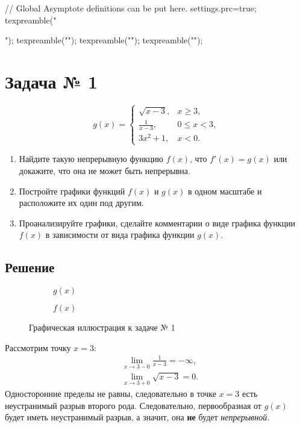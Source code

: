 \documentclass[a4paper,12pt]{article}
\begin{document}
\begin{asydef}
// Global Asymptote definitions can be put here.
settings.prc=true;
texpreamble("\usepackage{xltxtra,unicode-math}");
texpreamble("\setmainfont{Times New Roman}");
texpreamble("\setsansfont{Arial}\setmonofont{Courier New}");
texpreamble("");
\end{asydef}

\section{Задача № 1}

\[
  g(x) =
  \begin{cases}
    \sqrt{x - 3}, & x \ge 3, \\
    \frac{1}{x - 3}, & 0 \le x < 3, \\
    3 x^2 + 1, & x < 0.
  \end{cases}
\]

\begin{enumerate}
  \item
    Найдите такую непрерывную функцию \(f(x)\),
    что \(f'(x) = g(x)\) или докажите, что она не может быть непрерывна.
  \item
    Постройте графики функций \(f(x)\) и \(g(x)\) в одном масштабе
    и расположите их один под другим.
  \item
    Проанализируйте графики,
    сделайте комментарии о виде графика функции \(f(x)\)
    в зависимости от вида графика функции \(g(x)\).
\end{enumerate}

\subsection{Решение}

\begin{figure}[htbp]
  \centering
  \begin{subfigure}{\textwidth}
    \centering
    \caption{\(g(x)\)}\label{fig:1-g}
  \end{subfigure}
  \begin{subfigure}{\textwidth}
    \centering
    \caption{\(f(x)\)}\label{fig:1-f}
  \end{subfigure}
  \caption{Графическая иллюстрация к задаче № 1} \label{fig:1}
\end{figure}

Рассмотрим точку \(x = 3\):
\begin{align*}
  &\lim_{x \to 3 - 0} \frac{1}{x - 3} = -\infty, \\
  &\lim_{x \to 3 + 0} \sqrt{x - 3} = 0.
\end{align*}
Односторонние пределы не равны, следовательно в точке
\(x = 3\) есть неустранимый разрыв второго рода.
Следовательно, первообразная от \(g(x)\) будет иметь
неустранимый разрыв, а значит, она \textbf{не} будет \textit{непрерывной}.
\end{document}
